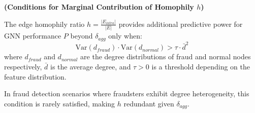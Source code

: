 
\begin{theorem}
\label{thm:homophily_marginal}
\textbf{(Conditions for Marginal Contribution of Homophily $h$)}

The edge homophily ratio $h = \frac{|E_{intra}|}{|E|}$ provides additional predictive power for GNN performance $P$ beyond $\delta_{agg}$ only when:
\begin{equation}
\text{Var}(d_{fraud}) \cdot \text{Var}(d_{normal}) > \tau \cdot \bar{d}^2
\end{equation}
where $d_{fraud}$ and $d_{normal}$ are the degree distributions of fraud and normal nodes respectively, $\bar{d}$ is the average degree, and $\tau > 0$ is a threshold depending on the feature distribution.

In fraud detection scenarios where fraudsters exhibit degree heterogeneity, this condition is rarely satisfied, making $h$ redundant given $\delta_{agg}$.
\end{theorem}


